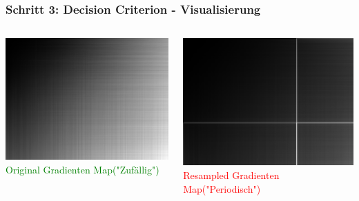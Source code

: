 \documentclass[11pt,t,usepdftitle=false,aspectratio=169]{beamer}
\begin{document}
\begin{frame}
	\frametitle{Schritt 3: Decision Criterion - Visualisierung}
	\begin{columns}[T]
		\begin{column}{0.48\textwidth}
			\includegraphics[width=\textwidth]{images/examples_unedited/gradient_map.png}
			\textcolor{green}{\small Original Gradienten Map("Zufällig")}
		\end{column}
		\begin{column}{0.48\textwidth}
			\includegraphics[width=\textwidth]{images/examples_edited/gradient_map.png}
			\textcolor{red}{\small Resampled Gradienten Map("Periodisch")}
		\end{column}
	\end{columns}
\end{frame}
\end{document}
